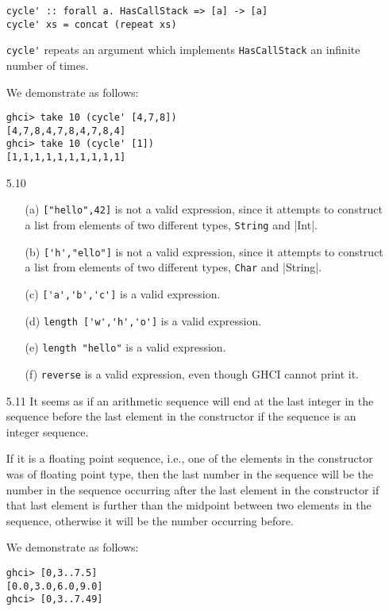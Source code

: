 \documentclass{article}
\begin{document}
\begin{itemize}
\begin{verbatim}
cycle' :: forall a. HasCallStack => [a] -> [a]
cycle' xs = concat (repeat xs)
        \end{verbatim}
        \verb|cycle'| repeats an argument which implements \verb|HasCallStack| an
        infinite number of times.\par
        \qquad We demonstrate as follows:
        \begin{verbatim}
ghci> take 10 (cycle' [4,7,8])
[4,7,8,4,7,8,4,7,8,4]
ghci> take 10 (cycle' [1])
[1,1,1,1,1,1,1,1,1,1]
        \end{verbatim}
        \item[5.10]
        \begin{itemize}
            \item[(a)] \verb|["hello",42]| is not a valid expression, since it
            attempts to construct a list from elements of two different types,
            \verb|String| and |Int|.
            \item[(b)] \verb|['h',"ello"]| is not a valid expression, since it
            attempts to construct a list from elements of two different types,
            \verb|Char| and |String|.
            \item[(c)] \verb|['a','b','c']| is a valid expression.
            \item[(d)] \verb|length ['w','h','o']| is a valid expression.
            \item[(e)] \verb|length "hello"| is a valid expression.
            \item[(f)] \verb|reverse| is a valid expression, even though GHCI cannot
            print it.
        \end{itemize}
        \item[5.11] It seems as if an arithmetic sequence will end at the last 
        integer in the sequence before the last element in the constructor if the 
        sequence is an integer sequence.\par
        \qquad If it is a floating point sequence, i.e., one of the elements in the 
        constructor was of floating point type, then the last number in the sequence 
        will be the number in the sequence occurring after the last element in the 
        constructor if that last element is further than the midpoint between two 
        elements in the sequence, otherwise it will be the number occurring before.\par
        We demonstrate as follows:
        \begin{verbatim}
ghci> [0,3..7.5]
[0.0,3.0,6.0,9.0]
ghci> [0,3..7.49]

\end{verbatim}
\end{itemize}
\end{document}
